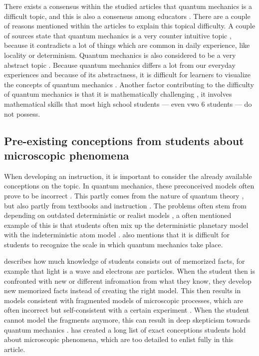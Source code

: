 \documentclass[11pt,twoside]{report} %
\begin{document}
There exists a consensus within the studied articles that quantum mechanics is a difficult topic, and this is also a consensus among educators \cite{gianino,papaphotis1,papaphotis2}. There are a couple of reasons mentioned within the articles to explain this topical difficulty. A couple of sources state that quantum mechanics is a very counter intuitive topic \cite{henriksen, levrini, mckagan, singh2}, because it contradicts a lot of things which are common in daily experience, like locality or determinism. Quantum mechanics is also considered to be a very abstract topic \cite{barnes, gianino, mckagan, papaphotis1, singh1}. Because quantum mechanics differs a lot from our everyday experiences and because of its abstractness, it is difficult for learners to visualize the concepts of quantum mechanics \cite{henriksen, mckagan}. Another factor contributing to the difficulty of quantum mechanics is that it is mathematically challenging \cite{gianino, mckagan}, it involves mathematical skills that most high school students --- even vwo 6 students --- do not possess.

\subsection{Pre-existing conceptions from students about microscopic phenomena}

When developing an instruction, it is important to consider the already available conceptions on the topic. In quantum mechanics, these preconceived models often prove to be incorrect \cite{asikainen, papaphotis2, thacker}. This partly comes from the nature of quantum theory \cite{papaphotis2}, but also partly from textbooks and instruction \cite{hubber, papaphotis2}. The problems often stem from depending on outdated deterministic or realist models \cite{hubber, papaphotis1, papaphotis2}, a often mentioned example of this is that students often mix up the deterministic planetary model with the indeterministic atom model \cite{dori, henriksen, hubber, muller, papaphotis1, papaphotis2}.  also mentions that it is difficult for students to recognize the scale in which quantum mechanics take place.

 describes how much knowledge of students consists out of memorized facts, for example that light is a wave and electrons are particles. When the student then is confronted with new or different infromation from what they know, they develop new memorized facts instead of creating the right model. This then results in models consistent with fragmented models of microscopic processes, which are often incorrect but self-consistent with a certain experiment \cite{hubber, thacker}. When the student cannot model the fragments anymore, this can result in deep skepticism towards quantum mechanics \cite{barnes, henriksen, levrini}.  has created a long list of exact conceptions students hold about microscopic phenomena, which are too detailed to enlist fully in this article.
\end{document}
